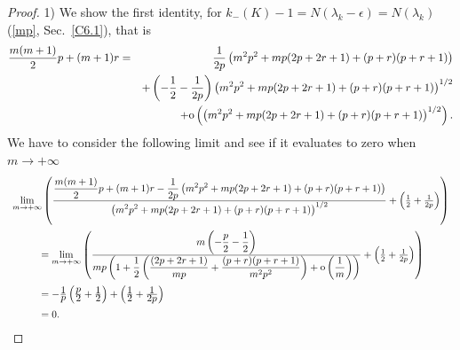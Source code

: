 \documentclass[11pt,a4paper,times]{amsart}
\theoremstyle{plain}
\theoremstyle{definition}
\numberwithin{equation}{section}
\newcommand{\ds}{\displaystyle}
\newcommand{\eqskip}{ \vspace*{2mm}\\ }
\newcommand{\so}{{\rm o}}
\newcommand{\fr}[2]{\frac{\ds #1}{\ds #2}}
\begin{document}
{\begin{proof} 1) We show the first identity, for $k_-(K)-1=N(\lambda_k-\epsilon)=N(\lambda_k)$ (\ref{mp}, Sec.\ \ref{C6.1}), that is
\begin{eqnarray*}
\frac{m(m+1)}{2}p +(m+1)r
&=& \frac{1}{2p}\left( m^2p^2+ mp(2p+2r+1) + (p+r)(p+r+1)\right)\\
&&+\left( -\frac{1}{2} -\frac{1}{2p}\right)\left( m^2p^2+ mp(2p+2r+1) + (p+r)(p+r+1)\right)^{1/2}\\
&&
+\so\left(\left( m^2p^2+ mp(2p+2r+1) + (p+r)(p+r+1)\right)^{1/2}\right).
\end{eqnarray*}
We have to consider the following limit and see if it evaluates to zero when $m\to +\infty$
\begin{gather*}
\begin{array}{l}
{\ds \lim_{m\to +\infty}}\left(\fr{\frac{m(m+1)}{2}p +(m+1)r
-\fr{1}{2p}\left( m^2p^2+ mp(2p+2r+1) + (p+r)(p+r+1)\right)}{\left( m^2p^2+ mp(2p+2r+1) + (p+r)(p+r+1)\right)^{1/2}} + \left( \frac{1}{2}+\frac{1}{2p}\right)\right)\eqskip
\hspace*{1cm}={\ds \lim_{m\to +\infty}}
\left(\fr{m\left( -\frac{p}{2}-\frac{1}{2}\right)}{mp\left( 1+ \frac{1}{2}\left(\frac{(2p+2r+1)}{mp} + \frac{(p+r)(p+r+1)}{m^2p^2}\right)+\so\left(\frac{1}{m}\right)\right)}
+ \left( \frac{1}{2}+\frac{1}{2p}\right)
\right)\eqskip
\hspace*{1cm}= -\fr{1}{p}\left( \fr{p}{2}+\fr{1}{2}\right)
+ \left( \fr{1}{2}+\fr{1}{2p}\right)\eqskip \hspace*{1cm}=0.
\end{array}
\end{gather*}


\end{proof}}
\end{document}
